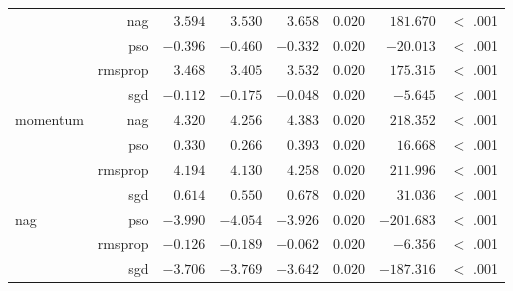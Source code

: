 \begin{table}[htbp]
{\begin{tabular}{lrrrrrrr}
			$ $                  & nag                  & $3.594$              & $3.530$                                         & $3.658$              & $0.020$              & $181.670$            & $<$ .001    \\
			                     & pso                  & $-0.396$             & $-0.460$                                        & $-0.332$             & $0.020$              & $-20.013$            & $<$ .001    \\
			                     & rmsprop              & $3.468$              & $3.405$                                         & $3.532$              & $0.020$              & $175.315$            & $<$ .001    \\
			                     & sgd                  & $-0.112$             & $-0.175$                                        & $-0.048$             & $0.020$              & $-5.645$             & $<$ .001    \\
			momentum             & nag                  & $4.320$              & $4.256$                                         & $4.383$              & $0.020$              & $218.352$            & $<$ .001    \\
			$ $                  & pso                  & $0.330$              & $0.266$                                         & $0.393$              & $0.020$              & $16.668$             & $<$ .001    \\
			                     & rmsprop              & $4.194$              & $4.130$                                         & $4.258$              & $0.020$              & $211.996$            & $<$ .001    \\
			                     & sgd                  & $0.614$              & $0.550$                                         & $0.678$              & $0.020$              & $31.036$             & $<$ .001    \\
			nag                  & pso                  & $-3.990$             & $-4.054$                                        & $-3.926$             & $0.020$              & $-201.683$           & $<$ .001    \\
			$ $                  & rmsprop              & $-0.126$             & $-0.189$                                        & $-0.062$             & $0.020$              & $-6.356$             & $<$ .001    \\
			                     & sgd                  & $-3.706$             & $-3.769$                                        & $-3.642$             & $0.020$              & $-187.316$           & $<$ .001    \\

\end{tabular}}
\end{table}
